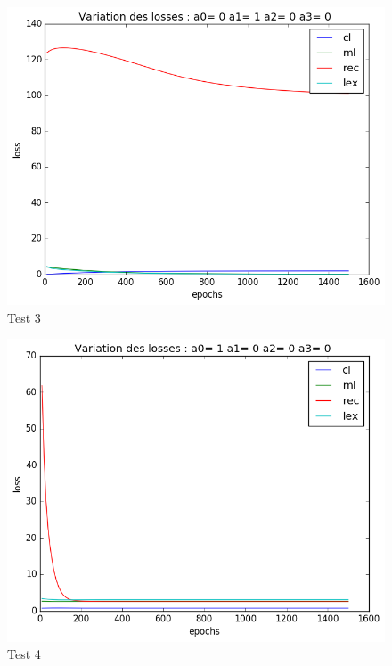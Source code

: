 \documentclass{article}
\begin{document}
\begin{figure}[!h]
  \centering
  \includegraphics[scale=0.8]{img/loss/test3.png}
  \caption{Test 3}
\end{figure}
\begin{figure}[!h]
  \centering
  \includegraphics[scale=0.8]{img/loss/test4.png}
  \caption{Test 4}
\end{figure}
\end{document}
